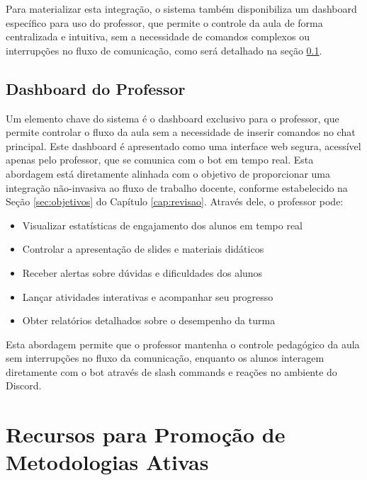 Para materializar esta integração, o sistema também disponibiliza um dashboard específico para uso do professor, que permite o controle da aula de forma centralizada e intuitiva, sem a necessidade de comandos complexos ou interrupções no fluxo de comunicação, como será detalhado na seção \ref{subsec:dashboard}.


\subsection{Dashboard do Professor}
\label{subsec:dashboard}

Um elemento chave do sistema é o dashboard exclusivo para o professor, que permite controlar o fluxo da aula sem a necessidade de inserir comandos no chat principal. Este dashboard é apresentado como uma interface web segura, acessível apenas pelo professor, que se comunica com o bot em tempo real. Esta abordagem está diretamente alinhada com o objetivo de proporcionar uma integração não-invasiva ao fluxo de trabalho docente, conforme estabelecido na Seção \ref{sec:objetivos} do Capítulo \ref{cap:revisao}. Através dele, o professor pode:

\begin{itemize}
\item Visualizar estatísticas de engajamento dos alunos em tempo real
\item Controlar a apresentação de slides e materiais didáticos
\item Receber alertas sobre dúvidas e dificuldades dos alunos
\item Lançar atividades interativas e acompanhar seu progresso
\item Obter relatórios detalhados sobre o desempenho da turma
\end{itemize}

Esta abordagem permite que o professor mantenha o controle pedagógico da aula sem interrupções no fluxo da comunicação, enquanto os alunos interagem diretamente com o bot através de slash commands e reações no ambiente do Discord.


\section{Recursos para Promoção de Metodologias Ativas}
\label{sec:recursos}

